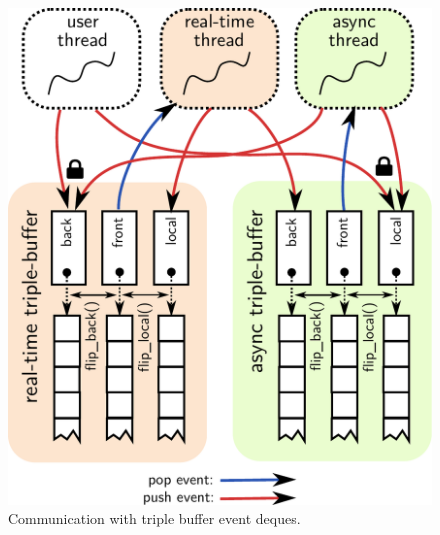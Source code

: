 \begin{figure}[h!]
  \centering
  \includegraphics[width=.9\textwidth]{pic/events.pdf}
  \caption{Communication with triple buffer event deques.}
  \label{fig:triplebuf}
\end{figure}

